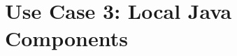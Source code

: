 \section{Use Case 3: Local Java Components}
\label{section:LocalJavaComponentImplementation}




\newpage